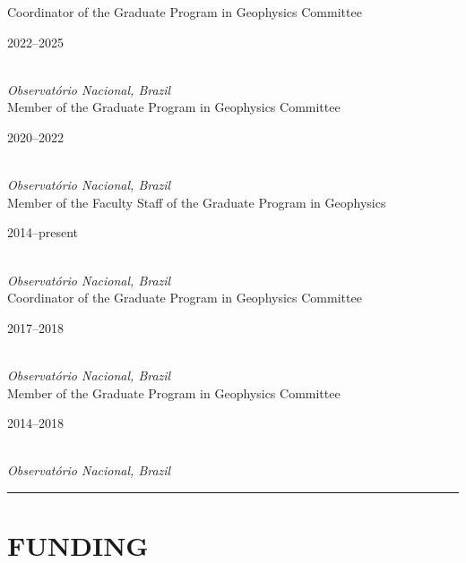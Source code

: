 \documentclass[11pt,a4paper,onecolumn]{article}
\begin{document}
\medskip
	
\noindent Coordinator of the Graduate Program in Geophysics Committee \hfill \parbox{0.1\textwidth}{\raggedright 2022--2025} \\
\noindent \textsl{Observat\'{o}rio Nacional, Brazil} \vspace{0.5\baselineskip} \\
\noindent Member of the Graduate Program in Geophysics Committee \hfill \parbox{0.1\textwidth}{\raggedright 2020--2022} \\
\noindent \textsl{Observat\'{o}rio Nacional, Brazil} \vspace{0.5\baselineskip} \\
\noindent Member of the Faculty Staff of the Graduate Program in Geophysics \hfill \parbox{0.1\textwidth}{\raggedright 2014--present} \\
\noindent \textsl{Observat\'{o}rio Nacional, Brazil} \vspace{0.5\baselineskip} \\
\noindent Coordinator of the Graduate Program in Geophysics Committee \hfill \parbox{0.1\textwidth}{\raggedright 2017--2018} \\
\noindent \textsl{Observat\'{o}rio Nacional, Brazil} \vspace{0.5\baselineskip} \\
\noindent Member of the Graduate Program in Geophysics Committee \hfill \parbox{0.1\textwidth}{\raggedright 2014--2018} \\
\noindent \textsl{Observat\'{o}rio Nacional, Brazil} \vspace{0.5\baselineskip} \\


\bigskip \hrule

\section*{FUNDING}
\end{document}

